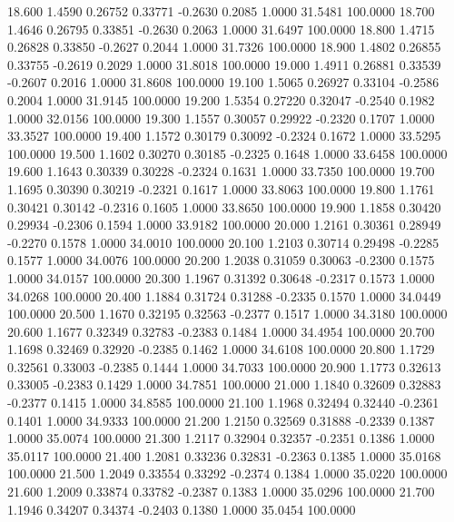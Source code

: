  18.600   1.4590   0.26752   0.33771  -0.2630   0.2085   1.0000  31.5481 100.0000
  18.700   1.4646   0.26795   0.33851  -0.2630   0.2063   1.0000  31.6497 100.0000
  18.800   1.4715   0.26828   0.33850  -0.2627   0.2044   1.0000  31.7326 100.0000
  18.900   1.4802   0.26855   0.33755  -0.2619   0.2029   1.0000  31.8018 100.0000
  19.000   1.4911   0.26881   0.33539  -0.2607   0.2016   1.0000  31.8608 100.0000
  19.100   1.5065   0.26927   0.33104  -0.2586   0.2004   1.0000  31.9145 100.0000
  19.200   1.5354   0.27220   0.32047  -0.2540   0.1982   1.0000  32.0156 100.0000
  19.300   1.1557   0.30057   0.29922  -0.2320   0.1707   1.0000  33.3527 100.0000
  19.400   1.1572   0.30179   0.30092  -0.2324   0.1672   1.0000  33.5295 100.0000
  19.500   1.1602   0.30270   0.30185  -0.2325   0.1648   1.0000  33.6458 100.0000
  19.600   1.1643   0.30339   0.30228  -0.2324   0.1631   1.0000  33.7350 100.0000
  19.700   1.1695   0.30390   0.30219  -0.2321   0.1617   1.0000  33.8063 100.0000
  19.800   1.1761   0.30421   0.30142  -0.2316   0.1605   1.0000  33.8650 100.0000
  19.900   1.1858   0.30420   0.29934  -0.2306   0.1594   1.0000  33.9182 100.0000
  20.000   1.2161   0.30361   0.28949  -0.2270   0.1578   1.0000  34.0010 100.0000
  20.100   1.2103   0.30714   0.29498  -0.2285   0.1577   1.0000  34.0076 100.0000
  20.200   1.2038   0.31059   0.30063  -0.2300   0.1575   1.0000  34.0157 100.0000
  20.300   1.1967   0.31392   0.30648  -0.2317   0.1573   1.0000  34.0268 100.0000
  20.400   1.1884   0.31724   0.31288  -0.2335   0.1570   1.0000  34.0449 100.0000
  20.500   1.1670   0.32195   0.32563  -0.2377   0.1517   1.0000  34.3180 100.0000
  20.600   1.1677   0.32349   0.32783  -0.2383   0.1484   1.0000  34.4954 100.0000
  20.700   1.1698   0.32469   0.32920  -0.2385   0.1462   1.0000  34.6108 100.0000
  20.800   1.1729   0.32561   0.33003  -0.2385   0.1444   1.0000  34.7033 100.0000
  20.900   1.1773   0.32613   0.33005  -0.2383   0.1429   1.0000  34.7851 100.0000
  21.000   1.1840   0.32609   0.32883  -0.2377   0.1415   1.0000  34.8585 100.0000
  21.100   1.1968   0.32494   0.32440  -0.2361   0.1401   1.0000  34.9333 100.0000
  21.200   1.2150   0.32569   0.31888  -0.2339   0.1387   1.0000  35.0074 100.0000
  21.300   1.2117   0.32904   0.32357  -0.2351   0.1386   1.0000  35.0117 100.0000
  21.400   1.2081   0.33236   0.32831  -0.2363   0.1385   1.0000  35.0168 100.0000
  21.500   1.2049   0.33554   0.33292  -0.2374   0.1384   1.0000  35.0220 100.0000
  21.600   1.2009   0.33874   0.33782  -0.2387   0.1383   1.0000  35.0296 100.0000
  21.700   1.1946   0.34207   0.34374  -0.2403   0.1380   1.0000  35.0454 100.0000
